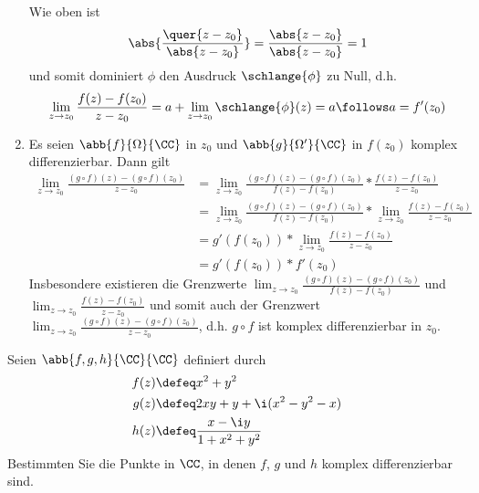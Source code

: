 \begin{exercisePage}
\begin{enumerate}[leftmargin=*, label=(zu \alph*)]
\begin{equivalence}
\begin{equation*}
		\end{equation*}
		Wie oben ist
		\begin{equation*}
			\abs{\frac{\quer{z-z_0}}{\abs{z-z_0}}} = \frac{\abs{z-z_0}}{\abs{z-z_0}} = 1
		\end{equation*}
		und somit dominiert $\phi$ den Ausdruck $\schlange{\phi}$ zu Null, d.h.
		\begin{equation*}
			\lim_{z \to z_0} \frac{f(z) - f(z_0)}{z-z_0} = a + \lim_{z \to z_0} \schlange{\phi}(z) = a \follows a = f'(z_0)
		\end{equation*}
	\end{equivalence}
\pagebreak
	\item Es seien $\abb{f}{\Omega}{\CC}$ in $z_0$ und $\abb{g}{\Omega'}{\CC}$ in $f(z_0)$ komplex differenzierbar.
	Dann gilt
	\begin{align*}
			\lim_{z \to z_0} \frac{(g \circ f) (z) - (g \circ f)(z_0)}{z - z_0}
			&= \lim_{z \to z_0} \frac{(g \circ f) (z) - (g \circ f)(z_0)}{f(z) - f(z_0)} * \frac{f(z) - f(z_0)}{z - z_0} \\
			&= \lim_{z \to z_0} \frac{(g \circ f) (z) - (g \circ f)(z_0)}{f(z) - f(z_0)} * \lim_{z \to z_0} \frac{f(z) - f(z_0)}{z - z_0} \\
			&= g'(f(z_0)) * \lim_{z \to z_0} \frac{f(z) - f(z_0)}{z - z_0} \tag{$g$ diffbar in $f(z_0)$} \\
			&= g'(f(z_0)) * f'(z_0) \tag{$f$ diffbar in $z_0$} 
	\end{align*}
	Insbesondere existieren die Grenzwerte $\lim_{z \to z_0} \frac{(g \circ f) (z) - (g \circ f)(z_0)}{f(z) - f(z_0)}$ und $\lim_{z \to z_0} \frac{f(z) - f(z_0)}{z - z_0}$ und somit auch der Grenzwert $\lim_{z \to z_0} \frac{(g \circ f) (z) - (g \circ f)(z_0)}{z - z_0}$, d.h. $g \circ f$ ist komplex differenzierbar in $z_0$.
\end{enumerate}

\begin{task}
	Seien $\abb{f,g,h}{\CC}{\CC}$ definiert durch
	\begin{equation*}
		\begin{aligned}
		f(z) &\defeq x^2 + y^2 \\
		g(z) &\defeq 2xy + y + \i (x^2 - y^2 - x) \\
		h(z) &\defeq \frac{x - \i y}{1 + x^2 + y^2}
		\end{aligned}
	\end{equation*}
	Bestimmten Sie die Punkte in $\CC$, in denen $f$, $g$ und $h$ komplex differenzierbar sind.
\end{task}


\end{exercisePage}
